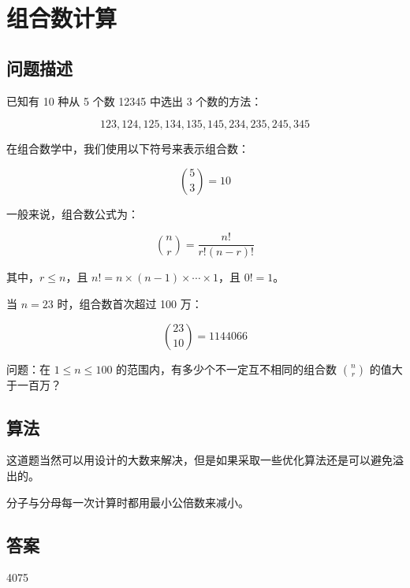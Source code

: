 \section{组合数计算}
\subsection{问题描述}
\begin{tcolorbox}
已知有 10 种从 5 个数 12345 中选出 3 个数的方法：

\[ 
123, 124, 125, 134, 135, 145, 234, 235, 245, 345 
\]

在组合数学中，我们使用以下符号来表示组合数：

\[
\binom{5}{3} = 10
\]

一般来说，组合数公式为：

\[
\binom{n}{r} = \frac{n!}{r!(n - r)!}
\]

其中，\(r \leq n\)，且 \(n! = n \times (n-1) \times \cdots \times 1\)，且 \(0! = 1\)。

当 \(n = 23\) 时，组合数首次超过 100 万：

\[
\binom{23}{10} = 1144066
\]

问题：在 \( 1 \leq n \leq 100 \) 的范围内，有多少个不一定互不相同的组合数 \( \binom{n}{r} \) 的值大于一百万？

\end{tcolorbox}

\subsection{算法}
这道题当然可以用设计的大数来解决，但是如果采取一些优化算法还是可以避免溢出的。

分子与分母每一次计算时都用最小公倍数来减小。

\subsection{答案}
4075
